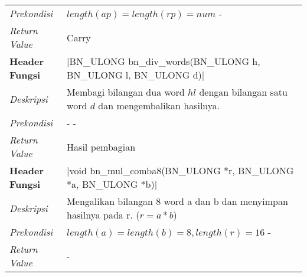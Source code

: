 \begin{table}[h]
\begin{tabular}{R{2.8cm}L{10.5cm}}
      \textit{Prekondisi}    & $length(ap) = length(rp) = num$ -                                                                                  \\
      \textit{Return Value}  & Carry
      \\ \bottomrule
      \textbf{Header Fungsi} & |BN_ULONG bn_div_words(BN_ULONG h, BN_ULONG l, BN_ULONG d)|                        \\ \midrule
      \textit{Deskripsi}  & Membagi bilangan dua word $hl$ dengan bilangan satu word $d$ dan mengembalikan hasilnya.                                                                                   \\
      \textit{Prekondisi}    & - -                                                                                  \\
      \textit{Return Value}  & Hasil pembagian
      \\ \bottomrule
      \textbf{Header Fungsi} & |void bn_mul_comba8(BN_ULONG *r, BN_ULONG *a, BN_ULONG *b)|                        \\ \midrule
      \textit{Deskripsi} &  Mengalikan bilangan 8 word a dan b dan menyimpan hasilnya pada r. ($r = a*b$)                                                                                    \\
      \textit{Prekondisi}    & $length(a) = length(b) = 8, length(r) = 16$ -                                                                                  \\
      \textit{Return Value}  & -
      \\ \bottomrule
    \end{tabular}
  \end{table}
